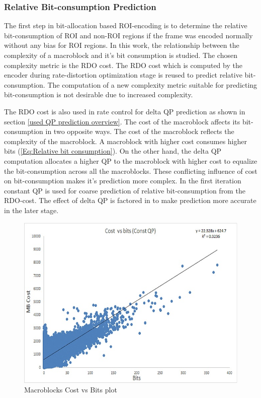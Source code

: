 \documentclass[11pt]{article} %
\begin{document}
\subsubsection{Relative Bit-consumption Prediction} \label{sec:Relative Bit-consumption Prediction}
The first step in bit-allocation based ROI-encoding is to determine the relative bit-consumption of ROI and non-ROI regions if the frame was encoded normally without any bias for ROI regions. In this work, the relationship between the complexity of a macroblock and it's bit consumption is studied. The chosen complexity metric is the RDO cost. The RDO cost which is computed by the encoder during rate-distortion optimization stage is reused to predict relative bit-consumption. The computation of a new complexity metric suitable for predicting bit-consumption is not desirable due to increased complexity. 

The RDO cost is also used in rate control for delta QP prediction as shown in section \ref{used QP prediction overview}. The cost of the macroblock affects its bit-consumption in two opposite ways. The cost of the macroblock reflects the complexity of the macroblock. A macroblock with higher cost consumes higher bits (\ref{Eq:Relative bit consumption}). On the other hand, the delta QP computation allocates a higher QP to the macroblock with higher cost to equalize the bit-consumption across all the macroblocks. These conflicting influence of cost on bit-consumption makes it's prediction more complex. In the first iteration constant QP is used for coarse prediction of relative bit-consumption from the RDO-cost. The effect of delta QP is factored in to make prediction more accurate in the later stage.

\begin{figure}[!h]
	\centering
	\includegraphics[scale=0.75]{CostVsBits/const_QP/CostvsBits_ConstQP_Full}  
	\caption{Macroblocks Cost vs Bits plot}
	\label{fig:CostvsBits_ConstQP_Full}
\end{figure}
\end{document}
